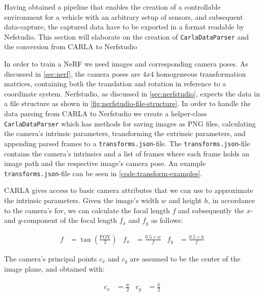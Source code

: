 Having obtained a pipeline that enables the creation of a controllable environment for a vehicle with an arbitrary setup of sensors, and subsequent data-capture, the captured data have to be exported in a format readable by Nefstudio. This section will elaborate on the creation of \texttt{CarlaDataParser} and the conversion from CARLA to Nerfstudio


In order to train a NeRF we need images and corresponding camera poses. As discussed in \autoref{sec:nerf}, the camera poses are $4x4$ homogeneous transformation matrices, containing both the translation and rotation in reference to a coordinate system. Nerfstudio, as discussed in \autoref{sec:nerfstudio}, expects the data in a file structure as shown in \autoref{fig:nerfstudio-file-structure}. In order to handle the data parsing from CARLA to Nerfstudio we create a helper-class \texttt{CarlaDataParser} which has methods for saving images as PNG files, calculating the camera's intrinsic parameters, transforming the extrinsic parameters, and appending parsed frames to a \texttt{transforms.json}-file. The \texttt{transforms.json}-file contains the camera's intrinsics and a list of frames where each frame holds an image path and the respective image's camera pose. An example \texttt{transforms.json}-file can be seen in \autoref{code:transform-examples}.




CARLA gives access to basic camera attributes that we can use to approximate the intrinsic parameters. Given the image's width $w$ and height $h$, in accordance to the camera's \acrfull{fov}, we can calculate the focal length $f$ and subsequently the $x$- and $y$-component of the focal length $f_x$ and $f_y$ as follows:

\begin{align*}
f &= \tan\left(\frac{\text{FOV}}{2}\right) &
f_x &= \frac{0.5 \times w}{f} &
f_y &= \frac{0.5 \times h}{f}
\end{align*}

The camera's principal points $c_x$ and $c_y$ are assumed to be the center of the image plane, and obtained with:

\begin{align*}
c_x &= \frac{w}{2} &
c_y &= \frac{h}{2}
\end{align*}

